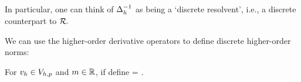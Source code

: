 In particular, one can think of $\Delta_{h}^{-1}$ as being a `discrete resolvent', i.e., a discrete counterpart to $\mathcal R.$

\ede




We can use the higher-order derivative operators to define discrete higher-order norms:

For $v_{h} \in V_{h,p}$ and $m \in \mathbb R$, if define
\beqs
\Nmh{\vh} = .
\eeqs
\ede




